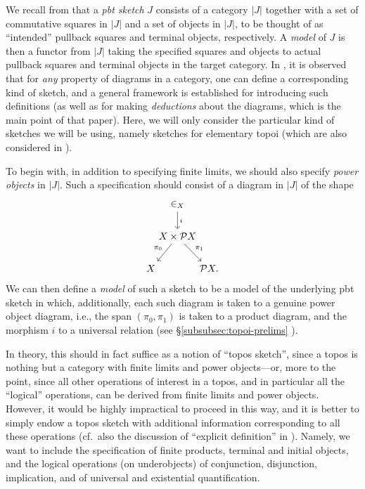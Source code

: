\documentclass{amsart}
\newcommand\abs[2][]{#1\lvert{#2}#1\rvert}
\newcommand\pow{\mathcal{P}}
\newcommand\prerefpost[3]{%
  \texorpdfstring%
    {\hyperref[#2]{#1\ref*{#2}#3}}%
    {#1\ref*{#2}#3}%
}
\newcommand\sref[1]{\prerefpost{\S}{#1}{}}
\theoremstyle{definition}
\theoremstyle{remark}
\theoremstyle{plainwithref}
\begin{document}
We recall from \cite[Appendix~A]{helfer-topoi-in-topoi} that a \emph{pbt sketch} \( J \) consists of a category \( \abs{J} \) together with a set of commutative squares in \( \abs{J} \) and a set of objects in \( \abs{J} \), to be thought of as ``intended'' pullback squares and terminal objects, respectively.
A \emph{model} of \( J \) is then a functor from \( \abs{J} \) taking the specified squares and objects to actual pullback squares and terminal objects in the target category.
In \cite{makkai-generalized-sketches-all}, it is observed that for \emph{any} property of diagrams in a category, one can define a corresponding kind of sketch, and a general framework is established for introducing such definitions (as well as for making \emph{deductions} about the diagrams, which is the main point of that paper).
Here, we will only consider the particular kind of sketches we will be using, namely sketches for elementary topoi (which are also considered in \cite[p.~198]{makkai-generalized-sketches-all}).

To begin with, in addition to specifying finite limits, we should also specify \emph{power objects} in \( \abs{J} \).
Such a specification should consist of a diagram in \( \abs{J} \) of the shape
\begin{equation} \label{eq:power-diagram}
  \begin{tikzcd}[column sep=-5pt]
    & \in_X \ar[d, "i"] \\
    & X \times \pow X \ar[dl, "\pi_0"'] \ar[dr, "\pi_1"] \\
    X & & \pow X.
  \end{tikzcd}
\end{equation}
We can then define a \emph{model} of such a sketch to be a model of the underlying pbt sketch in which, additionally, each such diagram is taken to a genuine power object diagram, i.e., the span \( (\pi_0,\pi_1) \) is taken to a product diagram, and the morphism \( i \) to a universal relation (see \sref{subsubsec:topoi-prelims}).

In theory, this should in fact suffice as a notion of ``topos sketch'', since a topos is nothing but a category with finite limits and power objects---or, more to the point, since all other operations of interest in a topos, and in particular all the ``logical'' operations, can be derived from finite limits and power objects.
However, it would be highly impractical to proceed in this way, and it is better to simply endow a topos sketch with additional information corresponding to all these operations (cf.\ also the discussion of ``explicit definition'' in \cite[p.~193]{makkai-generalized-sketches-all}).
Namely, we want to include the specification of finite products, terminal and initial objects, and the logical operations (on underobjects) of conjunction, disjunction, implication, and of universal and existential quantification.
\end{document}
